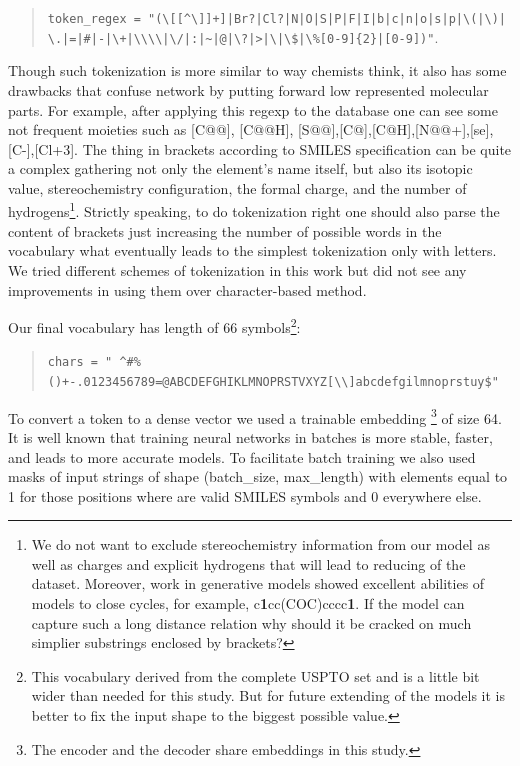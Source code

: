 \documentclass{article}
\begin{document}
\begin{quote}
\texttt{token\_regex = "(\textbackslash[[\textasciicircum \textbackslash]]+]|Br?|Cl?|N|O|S|P|F|I|b|c|n|o|s|p|\textbackslash(|\textbackslash)| \textbackslash.|=|\#|-|\textbackslash+|\textbackslash\textbackslash\textbackslash\textbackslash|\textbackslash/|:|\textasciitilde|@|\textbackslash?|>|\textbackslash*|\textbackslash\$|\textbackslash\%[0-9]\{2\}|[0-9])"}.
\end{quote}

Though such tokenization is more similar to way chemists think, it also has some drawbacks that confuse network by putting forward low represented molecular parts. For example, after applying this regexp to the database one can see some not frequent moieties such as [C@@], [C@@H], [S@@],[C@],[C@H],[N@@+],[se],[C-],[Cl+3]. The thing in brackets according to SMILES specification can be quite a complex gathering not only the element's name itself, but also its isotopic value, stereochemistry configuration, the formal charge, and the number of hydrogens\footnote{We do not want to exclude stereochemistry information from our model as well as charges and explicit hydrogens that will lead to reducing of the dataset. Moreover, work in generative models showed excellent abilities of models to close cycles, for example, c\textbf{1}cc(COC)cccc\textbf{1}. If the model can capture such a long distance relation why should it be cracked on much simplier substrings enclosed by brackets?}. Strictly speaking, to do tokenization right one should also parse the content of brackets just increasing the number of possible words in the vocabulary what eventually leads to the simplest tokenization only with letters. We tried different schemes of tokenization in this work but did not see any improvements in using them over character-based method.

Our final vocabulary has length of 66 symbols\footnote{This vocabulary derived from the complete USPTO set and is a little bit wider than needed for this study. But for future extending of the models it is better to fix the input shape to the biggest possible value.}:

\begin{quote}
\texttt{chars = " \textasciicircum\#\%()+-.\/0123456789=@ABCDEFGHIKLMNOPRSTVXYZ[\textbackslash\textbackslash]abcdefgilmnoprstuy\$"}
\end{quote}

To convert a token to a dense vector we used a trainable embedding
\footnote{The encoder and the decoder share embeddings in this study.} of size 64. 
It is well known that training neural networks in batches is more stable, faster, and leads to more accurate models. 
To facilitate batch training we also used masks of input strings of shape (batch\_size, max\_length) 
with elements equal to 1 for those positions where are valid SMILES symbols and 0 everywhere else. 
\end{document}
